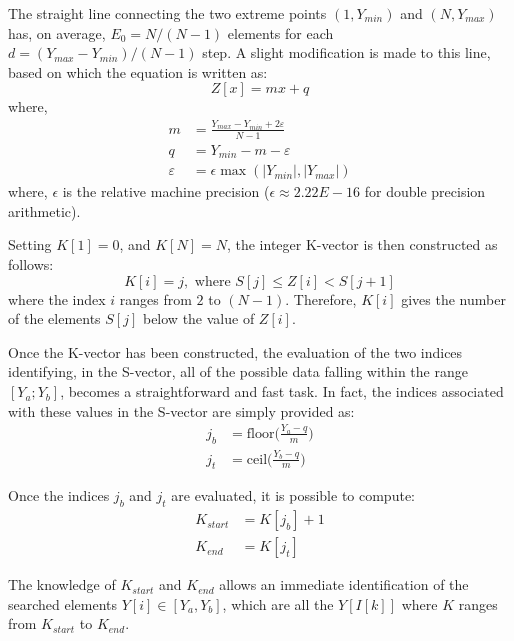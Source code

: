 \documentclass[../../main.tex]{subfiles}
\begin{document}
The straight line connecting the two extreme points $(1, Y_{min})$ and $(N, Y_{max})$ has, on average, $E_0 = N/(N-1)$ elements for each $d = (Y_{max} - Y_{min})/(N - 1)$ step. 
A slight modification is made to this line, based on which the equation is written as:
\begin{equation}
    Z[x] = mx + q
\end{equation}
where,
\begin{equation}
\begin{aligned}
    m &= \frac{Y_{max} - Y_{min} + 2\varepsilon}{N-1} \\
    q &= Y_{min} - m - \varepsilon \\
    \varepsilon &= \epsilon \max(|Y_{min}|, |Y_{max}|)
\end{aligned}
\end{equation}
where, $\epsilon$ is the relative machine precision ($\epsilon \approx 2.22E-16$ for double precision arithmetic).

Setting $K[1] = 0$, and $K[N] = N$, the integer K-vector is then constructed as follows:
\begin{equation}
    K[i] = j, \text{ where } S[j] \le Z[i] < S[j+1]
\end{equation}
where the index $i$ ranges from $2$ to $(N-1)$.
Therefore, $K[i]$ gives the number of the elements $S[j]$ below the value of $Z[i]$.

Once the K-vector has been constructed, the evaluation of the two indices identifying, in the S-vector, all of the possible data falling within the range $[Y_a; Y_b]$, becomes a straightforward and fast task. In fact, the indices associated with these values in the S-vector are simply provided as:
\begin{equation}
\begin{aligned}
    j_b &= \text{floor}\bigg( \frac{Y_a - q}{m} \bigg) \\
    j_t &= \text{ceil}\bigg( \frac{Y_b - q}{m} \bigg)
\end{aligned}
\end{equation}

Once the indices $j_b$ and $j_t$ are evaluated, it is possible to compute:
\begin{equation}
\begin{aligned}
    K_{start} &= K[j_b] + 1 \\
    K_{end} &= K[j_t]
\end{aligned}
\end{equation}

The knowledge of $K_{start}$ and $K_{end}$ allows an immediate identification of the searched elements $Y[i] \in [Y_a, Y_b]$, which are all the $Y[I[k]]$ where $K$ ranges from $K_{start}$ to $K_{end}$.
\newpage
\end{document}
